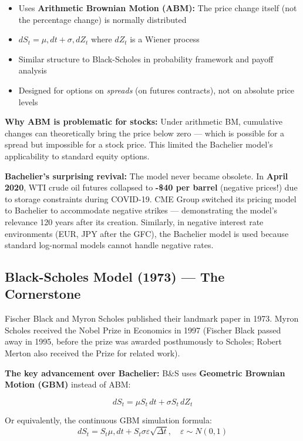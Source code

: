 \documentclass[12pt,openany]{book}
\theoremstyle{definition}
\theoremstyle{remark}
\begin{document}
\begin{itemize}
\item Uses \textbf{Arithmetic Brownian Motion (ABM):} The price change itself (not the percentage change) is normally distributed


\item $dS_t = \mu , dt + \sigma , dZ_t$ where $dZ_t$ is a Wiener process


\item Similar structure to Black-Scholes in probability framework and payoff analysis


\item Designed for options on \emph{spreads} (on futures contracts), not on absolute price levels


\end{itemize}
\textbf{Why ABM is problematic for stocks:} Under arithmetic BM, cumulative changes can theoretically bring the price below zero --- which is possible for a spread but impossible for a stock price. This limited the Bachelier model's applicability to standard equity options.

\textbf{Bachelier's surprising revival:} The model never became obsolete. In \textbf{April 2020}, WTI crude oil futures collapsed to \textbf{-\$40 per barrel} (negative prices!) due to storage constraints during COVID-19. CME Group switched its pricing model to Bachelier to accommodate negative strikes --- demonstrating the model's relevance 120 years after its creation. Similarly, in negative interest rate environments (EUR, JPY after the GFC), the Bachelier model is used because standard log-normal models cannot handle negative rates.

\medskip
\subsection{Black-Scholes Model (1973) --- The Cornerstone}
Fischer Black and Myron Scholes published their landmark paper in 1973. Myron Scholes received the Nobel Prize in Economics in 1997 (Fischer Black passed away in 1995, before the prize was awarded posthumously to Scholes; Robert Merton also received the Prize for related work).

\textbf{The key advancement over Bachelier:} B\&S uses \textbf{Geometric Brownian Motion (GBM)} instead of ABM:

\[
dS_t = \mu S_t \, dt + \sigma S_t \, dZ_t
\]

Or equivalently, the continuous GBM simulation formula: \[
dS_t = S_t \mu , dt + S_t \sigma \varepsilon \sqrt{\Delta t}, \quad \varepsilon \sim N(0,1)
\]
\end{document}

